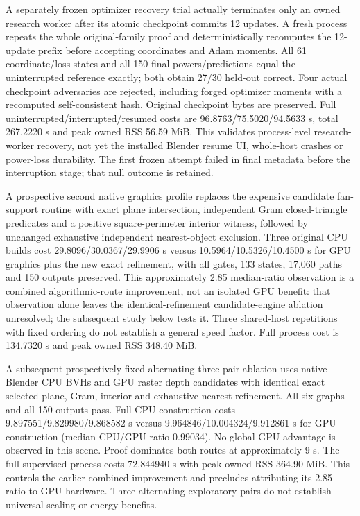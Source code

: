 \documentclass[
  10pt,
]{article}
\begin{document}
A separately frozen optimizer recovery trial actually terminates only an
owned research worker after its atomic checkpoint commits 12 updates. A
fresh process repeats the whole original-family proof and
deterministically recomputes the 12-update prefix before accepting
coordinates and Adam moments. All 61 coordinate/loss states and all 150
final powers/predictions equal the uninterrupted reference exactly; both
obtain 27/30 held-out correct. Four actual checkpoint adversaries are
rejected, including forged optimizer moments with a recomputed
self-consistent hash. Original checkpoint bytes are preserved. Full
uninterrupted/interrupted/resumed costs are 96.8763/75.5020/94.5633 s,
total 267.2220 s and peak owned RSS 56.59 MiB. This validates
process-level research-worker recovery, not yet the installed Blender
resume UI, whole-host crashes or power-loss durability. The first frozen
attempt failed in final metadata before the interruption stage; that
null outcome is retained.

A prospective second native graphics profile replaces the expensive
candidate fan-support routine with exact plane intersection, independent
Gram closed-triangle predicates and a positive square-perimeter interior
witness, followed by unchanged exhaustive independent nearest-object
exclusion. Three original CPU builds cost 29.8096/30.0367/29.9906 s
versus 10.5964/10.5326/10.4500 s for GPU graphics plus the new exact
refinement, with all gates, 133 states, 17,060 paths and 150 outputs
preserved. This approximately 2.85 median-ratio observation is a
combined algorithmic-route improvement, not an isolated GPU benefit:
that observation alone leaves the identical-refinement candidate-engine
ablation unresolved; the subsequent study below tests it. Three
shared-host repetitions with fixed ordering do not establish a general
speed factor. Full process cost is 134.7320 s and peak owned RSS 348.40
MiB.

A subsequent prospectively fixed alternating three-pair ablation uses
native Blender CPU BVHs and GPU raster depth candidates with identical
exact selected-plane, Gram, interior and exhaustive-nearest refinement.
All six graphs and all 150 outputs pass. Full CPU construction costs
9.897551/9.829980/9.868582 s versus 9.964846/10.004324/9.912861 s for
GPU construction (median CPU/GPU ratio 0.99034). No global GPU advantage
is observed in this scene. Proof dominates both routes at approximately
9 s. The full supervised process costs 72.844940 s with peak owned RSS
364.90 MiB. This controls the earlier combined improvement and precludes
attributing its 2.85 ratio to GPU hardware. Three alternating
exploratory pairs do not establish universal scaling or energy benefits.
\end{document}
